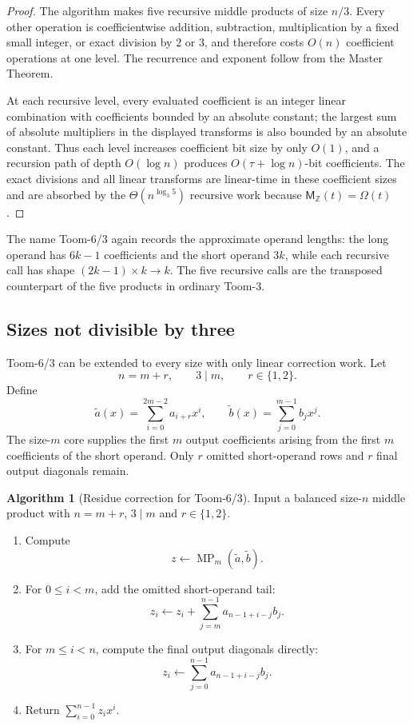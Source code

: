 \documentclass[11pt]{book}
\theoremstyle{definition}
\newtheorem{algorithm}[theorem]{Algorithm}
\newcommand{\ZZ}{\mathbb Z}
\newcommand{\MZ}{\mathsf M_{\ZZ}}
\begin{document}
\begin{proof}
The algorithm makes five recursive middle products of size $n/3$.  Every
other operation is coefficientwise addition, subtraction, multiplication by a
fixed small integer, or exact division by $2$ or $3$, and therefore costs
$O(n)$ coefficient operations at one level.  The recurrence and exponent
follow from the Master Theorem.

At each recursive level, every evaluated coefficient is an integer linear
combination with coefficients bounded by an absolute constant; the largest
sum of absolute multipliers in the displayed transforms is also bounded by an
absolute constant.  Thus each level increases coefficient bit size by only
$O(1)$, and a recursion path of depth $O(\log n)$ produces
$O(\tau+\log n)$-bit coefficients.  The exact divisions and all linear
transforms are linear-time in these coefficient sizes and are absorbed by the
$\Theta(n^{\log_3 5})$ recursive work because $\MZ(t)=\Omega(t)$.
\end{proof}

The name Toom-6/3 again records the approximate operand lengths: the long
operand has $6k-1$ coefficients and the short operand $3k$, while each
recursive call has shape $(2k-1)\times k\to k$.  The five recursive calls are
the transposed counterpart of the five products in ordinary Toom-3.

\subsection{Sizes not divisible by three}

Toom-6/3 can be extended to every size with only linear correction work.  Let
\[
 n=m+r,\qquad 3\mid m,\qquad r\in\{1,2\}.
\]
Define
\[
 \widetilde a(x)=\sum_{i=0}^{2m-2}a_{i+r}x^i,
 \qquad
 \widetilde b(x)=\sum_{j=0}^{m-1}b_jx^j.
\]
The size-$m$ core supplies the first $m$ output coefficients arising from the
first $m$ coefficients of the short operand.  Only $r$ omitted short-operand
rows and $r$ final output diagonals remain.

\begin{algorithm}[Residue correction for Toom-6/3]\label{alg:middle-toom63-tail}
Input a balanced size-$n$ middle product with $n=m+r$, $3\mid m$ and
$r\in\{1,2\}$.
\begin{enumerate}
 \item Compute
 \[
    z\leftarrow\operatorname{MP}_m(\widetilde a,\widetilde b).
 \]
 \item For $0\leq i<m$, add the omitted short-operand tail:
 \[
    z_i\leftarrow z_i+
       \sum_{j=m}^{n-1}a_{n-1+i-j}b_j.
 \]
 \item For $m\leq i<n$, compute the final output diagonals directly:
 \[
    z_i\leftarrow\sum_{j=0}^{n-1}a_{n-1+i-j}b_j.
 \]
 \item Return $\sum_{i=0}^{n-1}z_ix^i$.
\end{enumerate}
\end{algorithm}
\end{document}
